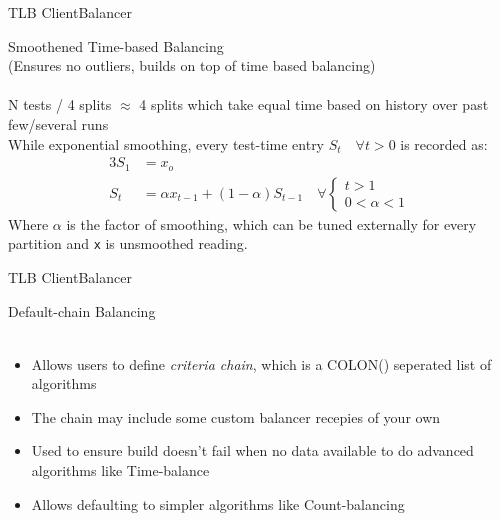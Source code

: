 \documentclass{beamer}
\begin{document}
\begin{frame}{TLB Client}{Balancer}
  \begin{center}
    {\large Smoothened Time-based Balancing}\\
    {\tiny (Ensures no outliers, builds on top of time based balancing)}\\
    \quad\\
    {\small N tests / 4 splits $\approx$ 4 splits which take equal time based on history over past few/several runs \\
    While exponential smoothing, every test-time entry $ S_t \quad \forall t > 0 $ is recorded as:}
    \begin{alignat}{3}
      S_1 & = x_o\\
      S_t & = \alpha x_{t-1} + (1 - \alpha)S_{t-1} \quad
      \forall 
      \begin{cases}
        t > 1\\ 
        0 < \alpha < 1
      \end{cases}
    \end{alignat}
    {\tiny Where $\alpha$ is the factor of smoothing, which can be tuned externally for every partition and \texttt{x} is unsmoothed reading.}
  \end{center}
\end{frame}

\begin{frame}{TLB Client}{Balancer}
  \begin{center}
    {\large Default-chain Balancing}\\
    \quad\\
    \begin{itemize}
    \item Allows users to define \emph{criteria chain}, which is a COLON(\text{:}) seperated list of algorithms
    \item The chain may include some custom balancer recepies of your own
    \item Used to ensure build doesn't fail when no data available to do advanced algorithms like Time-balance
    \item Allows defaulting to simpler algorithms like Count-balancing
    \end{itemize}
  \end{center}
\end{frame}
\end{document}
